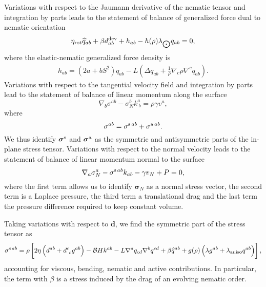 Variations with respect to the Jaumann derivative of the nematic tensor and integration by parts leads to the statement of balance of generalized force dual to nematic orientation 
\begin{equation} \label{78_II}
	\eta_{\text{rot}} \widehat{q}_{ab}  + \beta  d^{\textup{dev}}_{ab}  +  h_{ab} - h(\rho)\lambda_{\bigodot} q_{ab} = 0 ,
\end{equation}
where the elastic-nematic generalized force density is 
\begin{align} \label{79_II}
	h_{ab} =  ( 2a+bS^2 ) q_{ab} -  L\left(\Delta q_{ab} + \frac{1}{\rho} \nabla_c \rho \nabla^c q_{ab}\right).
\end{align}
Variations with respect to the tangential velocity field and integration by parts lead to the statement of balance  of linear momentum along the surface
\begin{equation}  \label{72_II}
	\nabla_b \sigma^{ab} -\sigma_N^b k^a_{~b}=\rho \gamma  v^a,
\end{equation}
where
\begin{equation}  \label{73_II}
	\sigma^{ab} =  \sigma^{\textup{s}\, ab } + \sigma^{\textup{a}  \, ab} .
\end{equation}
We thus identify $\bm{\sigma}^{\textup{s}}$ and $\bm{\sigma}^{\textup{a}}$ as the symmetric and antisymmetric parts of the in-plane stress tensor.
Variations with respect to the normal velocity leads to the statement of balance of linear momentum normal to the surface 
\begin{equation}  \label{74_II}
	\nabla_a  \sigma^a_N -  \sigma^{\textup{s}\, ab} k_{ab} - \gamma v_N  +P=0,
\end{equation} 
where the first term allows us to identify $\bm{\sigma}_N$ as a normal stress vector, the second term is a Laplace pressure, the third term a translational drag and the last term the pressure difference required to keep constant volume.

Taking variations with respect to $\bm{d}$, we find the symmetric part of the stress tensor as 
\begin{align}  \label{65_II}
	\sigma^{\textup{s} \,ab}  = \rho \left[  2\eta \left(d^{ab} +   d_{~c}^c g^{ab}\right)  -\mathcal{B}Hk^{ab}  -L\nabla^a q_{cd} \nabla^b q^{cd} + \beta \widehat{q}^{ab}   %
	+g(\rho)\left(\lambda  g^{ab} +  \lambda_{\rm aniso} q^{ab} \right) \right],
\end{align}
accounting for viscous, bending, nematic and active contributions. In particular, the term with $\beta$ is a stress induced by the drag of an evolving nematic order.

